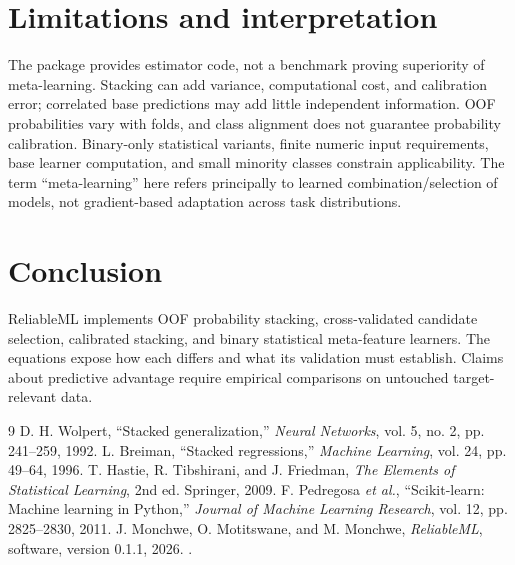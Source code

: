 \documentclass[conference]{IEEEtran}
\begin{document}
\section{Limitations and interpretation}
The package provides estimator code, not a benchmark proving superiority of meta-learning. Stacking can add variance, computational cost, and calibration error; correlated base predictions may add little independent information. OOF probabilities vary with folds, and class alignment does not guarantee probability calibration. Binary-only statistical variants, finite numeric input requirements, base learner computation, and small minority classes constrain applicability. The term ``meta-learning'' here refers principally to learned combination/selection of models, not gradient-based adaptation across task distributions.

\section{Conclusion}
ReliableML implements OOF probability stacking, cross-validated candidate selection, calibrated stacking, and binary statistical meta-feature learners. The equations expose how each differs and what its validation must establish. Claims about predictive advantage require empirical comparisons on untouched target-relevant data.

\begin{thebibliography}{9}
 D. H. Wolpert, ``Stacked generalization,'' \emph{Neural Networks}, vol. 5, no. 2, pp. 241--259, 1992.
 L. Breiman, ``Stacked regressions,'' \emph{Machine Learning}, vol. 24, pp. 49--64, 1996.
 T. Hastie, R. Tibshirani, and J. Friedman, \emph{The Elements of Statistical Learning}, 2nd ed. Springer, 2009.
 F. Pedregosa \emph{et al.}, ``Scikit-learn: Machine learning in Python,'' \emph{Journal of Machine Learning Research}, vol. 12, pp. 2825--2830, 2011.
 J. Monchwe, O. Motitswane, and M. Monchwe, \emph{ReliableML}, software, version 0.1.1, 2026. \projecturl.
\end{thebibliography}
\end{document}
